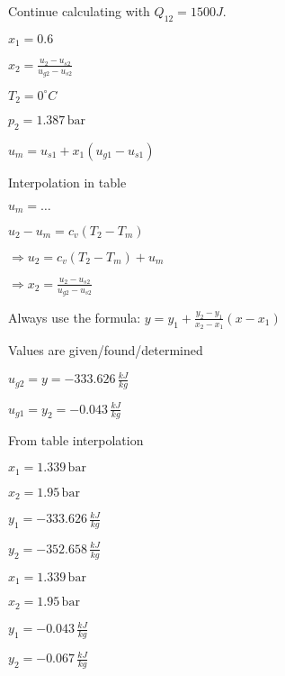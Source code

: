 Continue calculating with \( Q_{12} = 1500J \).

\( x_1 = 0.6 \)

\( x_2 = \frac{u_2 - u_{s2}}{u_{g2} - u_{s2}} \)

\( T_2 = 0^\circ C \)

\( p_2 = 1.387 \, \text{bar} \)

\( u_m = u_{s1} + x_1 (u_{g1} - u_{s1}) \)

Interpolation in table

\( u_m = \ldots \)

\( u_2 - u_m = c_v (T_2 - T_m) \)

\( \Rightarrow u_2 = c_v (T_2 - T_m) + u_m \)

\( \Rightarrow x_2 = \frac{u_2 - u_{s2}}{u_{g2} - u_{s2}} \)

Always use the formula: \( y = y_1 + \frac{y_2 - y_1}{x_2 - x_1} (x - x_1) \)

Values are given/found/determined

\( u_{g2} = y = -333.626 \, \frac{kJ}{kg} \)

\( u_{g1} = y_2 = -0.043 \, \frac{kJ}{kg} \)

From table interpolation

\( x_1 = 1.339 \, \text{bar} \)

\( x_2 = 1.95 \, \text{bar} \)

\( y_1 = -333.626 \, \frac{kJ}{kg} \)

\( y_2 = -352.658 \, \frac{kJ}{kg} \)

\( x_1 = 1.339 \, \text{bar} \)

\( x_2 = 1.95 \, \text{bar} \)

\( y_1 = -0.043 \, \frac{kJ}{kg} \)

\( y_2 = -0.067 \, \frac{kJ}{kg} \)
